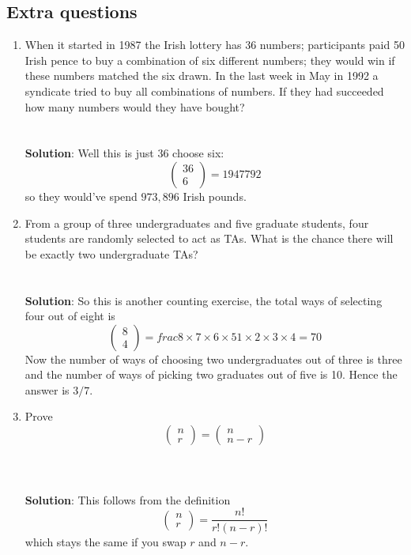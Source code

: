\documentclass[11pt,a4paper]{scrartcl}
\begin{document}
\subsection*{Extra questions}

\begin{enumerate}


\item When it started in 1987 the Irish lottery has 36 numbers;
  participants paid 50 Irish pence to buy a combination of six
  different numbers; they would win if these numbers matched the six
  drawn. In the last week in May in 1992 a syndicate tried to buy all
  combinations of numbers. If they had succeeded how many numbers
  would they have bought?\\ \\ \\ \textbf{Solution}: Well this is just 36 choose six:
\begin{equation}
\left(\begin{array}{c}36\\6\end{array}\right)=1947792
\end{equation}
so they would've spend $973,896$ Irish pounds.


\item From a group of three undergraduates and five graduate students,
  four students are randomly selected to act as TAs. What is the
  chance there will be exactly two undergraduate
  TAs?\\ \\ \\ \textbf{Solution}: So this is another counting exercise,
  the total ways of selecting four out of eight is
\begin{equation}
\left(\begin{array}{c}8\\4\end{array}\right)=frac{8\times 7\times 6 \times 5}{1\times 2\times 3\times 4}
=70
\end{equation}
Now the number of ways of choosing two undergraduates out of three is
three and the number of ways of picking two graduates out of five is
10. Hence the answer is $3/7$.


\item Prove
\begin{equation}
\left(\begin{array}{c}n\\r\end{array}\right)=\left(\begin{array}{c}n\\n-r\end{array}\right)
\end{equation}
\\ \\ \\ \textbf{Solution}: This follows from the definition
\begin{equation}
\left(\begin{array}{c}n\\r\end{array}\right)=\frac{n!}{r!(n-r)!}
\end{equation}
which stays the same if you swap $r$ and $n-r$.

\end{enumerate}
\end{document}
